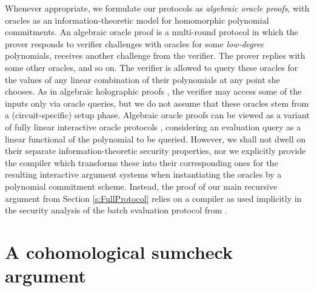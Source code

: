 \documentclass[10pt,article,oneside]{memoir}
\theoremstyle{definition}
\theoremstyle{remark}
\begin{document}
Whenever appropriate, we formulate our protocols as \textit{algebraic oracle proofs}, with oracles as an information-theoretic model for homomorphic polynomial commitments.
An algebraic oracle proof is a multi-round protocol in which the prover responds to verifier challenges with oracles for some \textit{low-degree} polynomials, receives another challenge from the verifier. 
The prover replies with some other oracles, and so on.
The verifier is allowed to query these oracles for the values of any linear combination of their polynomials at any point she chooses.
As in algebraic holographic proofs \cite{Marlin}, the verifier may access some of the inputs only via oracle queries, but we do not assume that these oracles stem from a (circuit-specific) setup phase.
Algebraic oracle proofs can be viewed as a variant of fully linear interactive oracle protocols \cite{FullyLinearPCPs}, considering an evaluation query as a linear functional of the polynomial to be queried.
However, we shall not dwell on their separate information-theoretic security properties, nor we explicitly provide the compiler which transforms these into their corresponding ones for the resulting interactive argument systems when instantiating the oracles by a polynomial commitment scheme.
Instead, the proof of our main recursive argument from Section \ref{s:FullProtocol} relies on a compiler as used implicitly in the security analysis of the batch evaluation protocol from \cite{HaloInfinite}.




\chapter{A cohomological sumcheck argument}
\label{s:CoboundarySumcheck}
\end{document}
